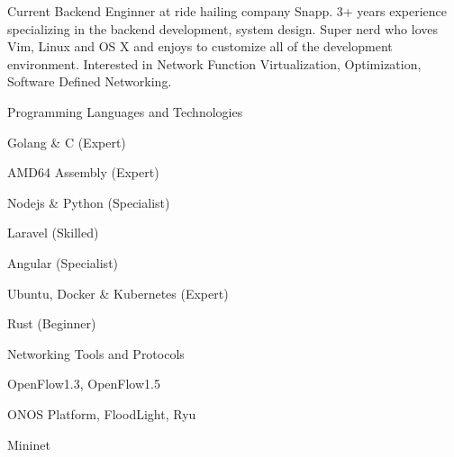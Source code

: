

\begin{cvparagraph}
Current Backend Enginner at ride hailing company Snapp.
3+ years experience specializing in the backend development, system design.
Super nerd who loves Vim, Linux and OS X and enjoys to customize all of the development environment.
Interested in Network Function Virtualization, Optimization, Software Defined Networking.
\end{cvparagraph}

\begin{cventries}
  \cventry
    {Programming Languages and Technologies}
    {}
    {}
    {}
    {
      \begin{cvitems}
        \item Golang \& C (Expert)
        \item AMD64 Assembly (Expert)
        \item Nodejs \& Python (Specialist)
        \item Laravel (Skilled)
        \item Angular (Specialist)
        \item Ubuntu, Docker \& Kubernetes (Expert)
        \item Rust (Beginner)
      \end{cvitems}
    }
\end{cventries}


\begin{cventries}
  \cventry
    {Networking Tools and Protocols}
    {}
    {}
    {}
    {
      \begin{cvitems}
        \item OpenFlow1.3, OpenFlow1.5
        \item ONOS Platform, FloodLight, Ryu
        \item Mininet
      \end{cvitems}
    }
\end{cventries}
